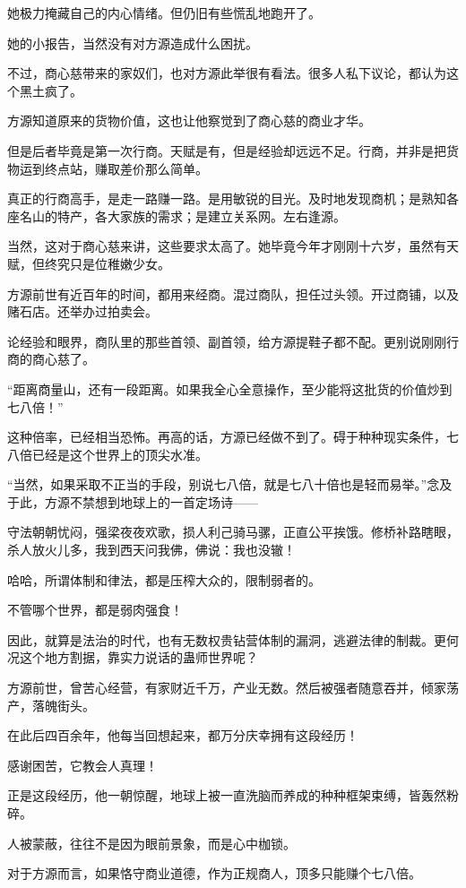 \begin{this_body}
她极力掩藏自己的内心情绪。但仍旧有些慌乱地跑开了。

她的小报告，当然没有对方源造成什么困扰。

不过，商心慈带来的家奴们，也对方源此举很有看法。很多人私下议论，都认为这个黑土疯了。

方源知道原来的货物价值，这也让他察觉到了商心慈的商业才华。

但是后者毕竟是第一次行商。天赋是有，但是经验却远远不足。行商，并非是把货物运到终点站，赚取差价那么简单。

真正的行商高手，是走一路赚一路。是用敏锐的目光。及时地发现商机；是熟知各座名山的特产，各大家族的需求；是建立关系网。左右逢源。

当然，这对于商心慈来讲，这些要求太高了。她毕竟今年才刚刚十六岁，虽然有天赋，但终究只是位稚嫩少女。

方源前世有近百年的时间，都用来经商。混过商队，担任过头领。开过商铺，以及赌石店。还举办过拍卖会。

论经验和眼界，商队里的那些首领、副首领，给方源提鞋子都不配。更别说刚刚行商的商心慈了。

“距离商量山，还有一段距离。如果我全心全意操作，至少能将这批货的价值炒到七八倍！”

这种倍率，已经相当恐怖。再高的话，方源已经做不到了。碍于种种现实条件，七八倍已经是这个世界上的顶尖水准。

“当然，如果采取不正当的手段，别说七八倍，就是七八十倍也是轻而易举。”念及于此，方源不禁想到地球上的一首定场诗——

守法朝朝忧闷，强梁夜夜欢歌，损人利己骑马骡，正直公平挨饿。修桥补路瞎眼，杀人放火儿多，我到西天问我佛，佛说：我也没辙！

哈哈，所谓体制和律法，都是压榨大众的，限制弱者的。

不管哪个世界，都是弱肉强食！

因此，就算是法治的时代，也有无数权贵钻营体制的漏洞，逃避法律的制裁。更何况这个地方割据，靠实力说话的蛊师世界呢？

方源前世，曾苦心经营，有家财近千万，产业无数。然后被强者随意吞并，倾家荡产，落魄街头。

在此后四百余年，他每当回想起来，都万分庆幸拥有这段经历！

感谢困苦，它教会人真理！

正是这段经历，他一朝惊醒，地球上被一直洗脑而养成的种种框架束缚，皆轰然粉碎。

人被蒙蔽，往往不是因为眼前景象，而是心中枷锁。

对于方源而言，如果恪守商业道德，作为正规商人，顶多只能赚个七八倍。


\end{this_body}
